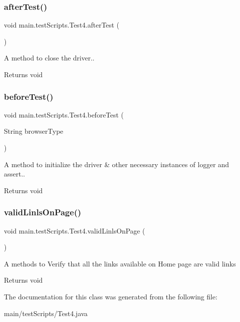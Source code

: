 \subsubsection{\texorpdfstring{after\+Test()}{afterTest()}}
{\footnotesize\ttfamily void main.\+test\+Scripts.\+Test4.\+after\+Test (\begin{DoxyParamCaption}{ }\end{DoxyParamCaption})}

A  method to close the driver.. \begin{DoxyReturn}{Returns}
void 
\end{DoxyReturn}
\mbox{\label{classmain_1_1test_scripts_1_1_test4_a05a50b74977f548b1bfef2a49a114a3a}} 
\subsubsection{\texorpdfstring{before\+Test()}{beforeTest()}}
{\footnotesize\ttfamily void main.\+test\+Scripts.\+Test4.\+before\+Test (\begin{DoxyParamCaption}\item[{String}]{browser\+Type }\end{DoxyParamCaption})}

A  method to initialize the driver \& other necessary instances of logger and assert.. \begin{DoxyReturn}{Returns}
void 
\end{DoxyReturn}
\mbox{\label{classmain_1_1test_scripts_1_1_test4_ab572b49f4fa2052ad6428c1b0563c9ea}} 
\subsubsection{\texorpdfstring{valid\+Linls\+On\+Page()}{validLinlsOnPage()}}
{\footnotesize\ttfamily void main.\+test\+Scripts.\+Test4.\+valid\+Linls\+On\+Page (\begin{DoxyParamCaption}{ }\end{DoxyParamCaption})}

A  methods to Verify that all the links available on Home page are valid links \begin{DoxyReturn}{Returns}
void 
\end{DoxyReturn}


The documentation for this class was generated from the following file\+:\begin{DoxyCompactItemize}
\item 
main/test\+Scripts/Test4.\+java\end{DoxyCompactItemize}
